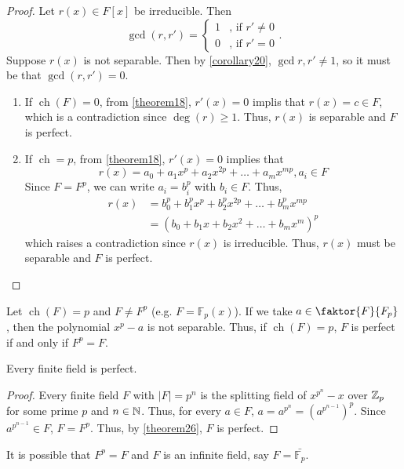 \documentclass[11pt]{article}
\newcommand{\quotient}[2]{\faktor{#1}{#2}}
\DeclareMathOperator{\ch}{ch}
\begin{document}
\begin{proof}
Let $r(x) \in F[x]$ be irreducible. Then
\begin{equation*}
\gcd(r,r') =
\begin{cases}
1 & \text{, if $r' \neq 0$}\\
0 & \text{, if $r' = 0$}
\end{cases}.
\end{equation*}
Suppose $r(x)$ is not separable. Then by \cref{corollary20}, $\gcd{r,r'} \neq
1$, so it must be that $\gcd(r,r') = 0$.
\begin{enumerate}
\item If $\ch(F) = 0$, from \cref{theorem18}, $r'(x) = 0$ implis that $r(x) = c
\in F$, which is a contradiction since $\deg(r) \geq 1$. Thus, $r(x)$ is
separable and $F$ is perfect.
\item If $\ch = p$, from \cref{theorem18}, $r'(x) = 0$ implies that
\begin{equation*}
r(x) = a_0 + a_1x^p + a_2x^{2p} + \dots + a_mx^{mp}, a_i \in F
\end{equation*}
Since $F = F^p$, we can write $a_i = b_i^p$ with $b_i \in F$. Thus,
\begin{align*}
r(x) &= b_0^p + b^p_1x^p + b^p_2x^{2p} + \dots + b^p_mx^{mp}\\
&= (b_0 + b_1x + b_2x^2 + \dots + b_mx^m)^p
\end{align*}
which raises a contradiction since $r(x)$ is irreducible. Thus, $r(x)$ must be
separable and $F$ is perfect.
\end{enumerate}
\end{proof}
\begin{remark}
Let $\ch(F) = p$ and $F \neq F^p$ (e.g. $F = \mathbb{F}_p(x)$). If we take
$a \in \quotient{F}{F_p}$, then the polynomial $x^p -a$ is not separable. Thus,
if $\ch(F) = p$, $F$ is perfect if and only if $F^p=F$.
\end{remark}
\begin{corollary}
Every finite field is perfect.
\label{corollary27}
\end{corollary}
\begin{proof}
Every finite field $F$ with $|F|=p^n$ is the splitting field of $x^{p^n} - x$
over $\mathbb{Z}_p$ for some prime $p$ and $n \in \mathbb{N}$. Thus, for every $a \in F$,
$a = a^{p^n} = (a^{p^{n-1}})^p$. Since $a^{p^{n-1}} \in F$, $F = F^p$. Thus, by
\cref{theorem26}, $F$ is perfect.
\end{proof}
\begin{remark}
It is possible that $F^p = F$ and $F$ is an infinite field, say $F =
\bar{\mathbb{F}_p}$.
\end{remark}
\end{document}
